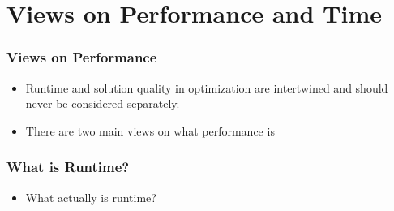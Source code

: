 \documentclass[aspectratio=169,mathserif,notheorems]{beamer}%
\begin{document}
\section{Views on Performance and Time}%
%
\begin{frame}%
\frametitle{Views on Performance}%
\begin{itemize}%
\item Runtime and solution quality in optimization are intertwined and should never be considered separately.%
\item<2-> There are two main views on what performance is\cite{HAFR2010RPBBOB2ES,NFR2011CCCOTD,WNT2010AAOAB,WWQLT2018ADCOAAPIBAWATCFEDASAIF}%
\end{itemize}%
%
%
%
%
\end{frame}%
%
\begin{frame}%
\frametitle{What is Runtime?}%
\begin{itemize}%
\item What actually is \alert{runtime}?%
\end{itemize}%
\end{frame}%
%
\end{document}

